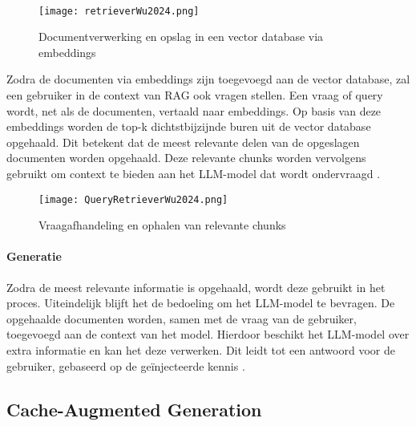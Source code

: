 \\[1em]
 \begin{figure}[H]
    \centering
    \texttt{[image: retrieverWu2024.png]}
    \caption{Documentverwerking en opslag in een vector database via embeddings \autocite{wu2025retrievalaugmentedgenerationnaturallanguage}}
    \label{fig:RAG opmaken vector database}
\end{figure}

Zodra de documenten via embeddings zijn toegevoegd aan de vector database, zal een gebruiker in de context van RAG ook vragen stellen. Een vraag of query wordt, net als de documenten, vertaald naar embeddings. Op basis van deze embeddings worden de top-k dichtstbijzijnde buren uit de vector database opgehaald. Dit betekent dat de meest relevante delen van de opgeslagen documenten worden opgehaald. Deze relevante chunks worden vervolgens gebruikt om context te bieden aan het LLM-model dat wordt ondervraagd \autocite{wu2025retrievalaugmentedgenerationnaturallanguage}.

        
\begin{figure}[H]
    \centering
    \texttt{[image: QueryRetrieverWu2024.png]}
    \caption{Vraagafhandeling en ophalen van relevante chunks \autocite{wu2025retrievalaugmentedgenerationnaturallanguage}}
    \label{fig:RAG bevragen vector database}
\end{figure}

\paragraph{Generatie}

Zodra de meest relevante informatie is opgehaald, wordt deze gebruikt in het proces. Uiteindelijk blijft het de bedoeling om het LLM-model te bevragen. De opgehaalde documenten worden, samen met de vraag van de gebruiker, toegevoegd aan de context van het model. Hierdoor beschikt het LLM-model over extra informatie en kan het deze verwerken. Dit leidt tot een antwoord voor de gebruiker, gebaseerd op de geïnjecteerde kennis \autocite{zhao2024retrievalaugmentedgenerationaigeneratedcontent}.

\subsection{Cache-Augmented Generation}

